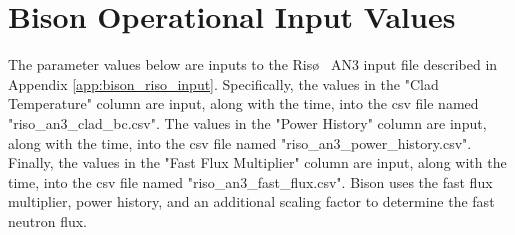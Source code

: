 \documentclass[thesis]{thesis-umich}
\begin{document}
\chapter{Bison Operational Input Values}
\label{app:bison_operating_conds}
The parameter values below are inputs to the Ris\o~ AN3 input file described in Appendix \ref{app:bison_riso_input}. Specifically, the values in the "Clad Temperature" column are input, along with the time, into the csv file named "riso\_an3\_clad\_bc.csv". The values in the "Power History" column are input, along with the time, into the csv file named "riso\_an3\_power\_history.csv". Finally, the values in the "Fast Flux Multiplier" column are input, along with the time, into the csv file named "riso\_an3\_fast\_flux.csv". Bison uses the fast flux multiplier, power history, and an additional scaling factor to determine the fast neutron flux.     
   




\end{document}
